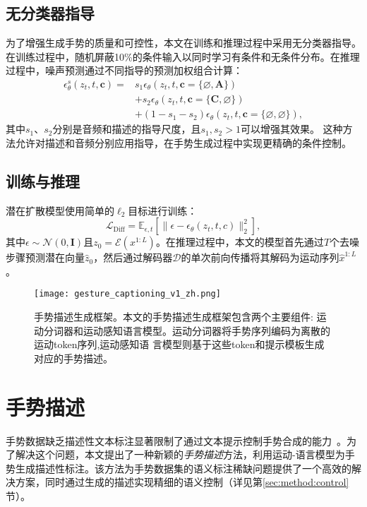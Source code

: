 \subsection{无分类器指导}
为了增强生成手势的质量和可控性，本文在训练和推理过程中采用无分类器指导\cite{ho2022classifier}。在训练过程中，随机屏蔽10\%的条件输入以同时学习有条件和无条件分布。在推理过程中，噪声预测通过不同指导的预测加权组合计算：
\begin{equation}
  \begin{split}
      \epsilon_\theta^s(z_t, t, \mathbf{c}) = & s_1 \epsilon_\theta(z_t, t, \mathbf{c}=\{\varnothing, \mathbf{A}\}) \\
      & + s_2 \epsilon_\theta(z_t, t, \mathbf{c}=\{\mathbf{C}, \varnothing\}) \\
      & + (1 - s_1 - s_2) \epsilon_\theta(z_t, t, \mathbf{c}=\{\varnothing, \varnothing\}),
  \end{split}
\end{equation}
其中$s_1$、$s_2$分别是音频和描述的指导尺度，且$s_1, s_2 > 1$可以增强其效果。
这种方法允许对描述和音频分别应用指导，在手势生成过程中实现更精确的条件控制。

\subsection{训练与推理}
潜在扩散模型使用简单的$\ell_2$目标进行训练\cite{ho2020ddpm, chen2023executing}：
\begin{equation}
  \mathcal{L}_{\text{Diff}} = \mathbb{E}_{\epsilon,t}[\|\epsilon - \epsilon_\theta(z_t, t, c)\|_2^2],
\end{equation}
其中$\epsilon \sim \mathcal{N}(0,\mathbf{I})$且$z_0 = \mathcal{E}(x^{1:L})$。在推理过程中，本文的模型首先通过$T$个去噪步骤预测潜在向量$\hat{z}_0$，然后通过解码器$\mathcal{D}$的单次前向传播将其解码为运动序列$\hat{x}^{1:L}$。

\begin{figure*}[t]
  \centering
  \texttt{[image: gesture\_captioning\_v1\_zh.png]}
  \caption{手势描述生成框架。本文的手势描述生成框架包含两个主要组件:
  运动分词器和运动感知语言模型。运动分词器将手势序列编码为离散的运动token序列,运动感知语
  言模型则基于这些token和提示模板生成对应的手势描述。}
  \label{fig:method:captioning}
\end{figure*}

\section{手势描述}
\label{sec:method:caption}
手势数据缺乏描述性文本标注显著限制了通过文本提示控制手势合成的能力~\cite{chen2024syntalker}。为了解决这个问题，本文提出了一种新颖的\textit{手势描述}方法，利用运动-语言模型为手势生成描述性标注。该方法为手势数据集的语义标注稀缺问题提供了一个高效的解决方案，同时通过生成的描述实现精细的语义控制（详见第\ref{sec:method:control}节）。

